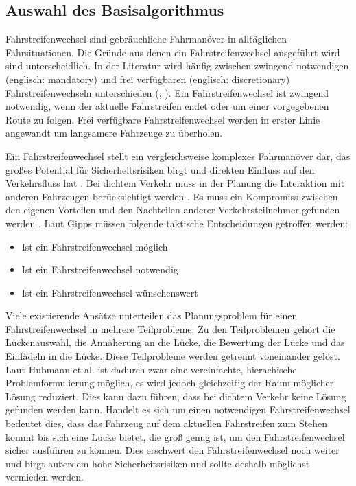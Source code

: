 \subsection{Auswahl des Basisalgorithmus}
\label{sec:AuswahlBA}
Fahrstreifenwechsel sind gebr\"auchliche Fahrman\"over in allt\"aglichen Fahrsituationen.
Die Gr\"unde aus denen ein Fahrstreifenwechsel ausgef\"uhrt wird sind unterscheidlich.
In der Literatur wird h\"aufig zwischen zwingend notwendigen (englisch: mandatory) und frei verf\"ugbaren (englisch: discretionary) Fahrstreifenwechseln unterschieden (\cite{Toledo2003}, \cite{Yang1996}).
Ein Fahrstreifenwechsel ist zwingend notwendig, wenn der aktuelle Fahrstreifen endet oder um einer vorgegebenen Route zu folgen.
Frei verf\"ugbare Fahrstreifenwechsel werden in erster Linie angewandt um langsamere Fahrzeuge zu \"uberholen.

Ein Fahrstreifenwechsel stellt ein vergleichsweise komplexes Fahrman\"over dar, das gro{\ss}es Potential f\"ur Sicherheitsrisiken birgt und direkten Einfluss auf den Verkehrsfluss hat \cite{Julian2015}.
Bei dichtem Verkehr muss in der Planung die Interaktion mit anderen Fahrzeugen ber\"ucksichtigt werden \cite{Hubmann2018}.
Es muss ein Kompromiss zwischen den eigenen Vorteilen und den Nachteilen anderer Verkehrsteilnehmer gefunden werden \cite{Kesting2007}.
Laut Gipps \cite{Gipps1986} m\"ussen folgende taktische Entscheidungen getroffen werden: 

\begin{itemize}
\item Ist ein Fahrstreifenwechsel m\"oglich
\item Ist ein Fahrstreifenwechsel notwendig
\item Ist ein Fahrstreifenwechsel w\"unschenswert
\end{itemize}


Viele existierende Ans\"atze unterteilen das Planungsproblem f\"ur einen Fahrstreifenwechsel in mehrere Teilprobleme. 
Zu den Teilproblemen geh\"ort die L\"uckenauswahl, die Ann\"aherung an die L\"ucke, die Bewertung der L\"ucke und das Einf\"adeln in die L\"ucke.
Diese Teilprobleme werden getrennt voneinander gel\"ost. \cite{Hubmann2018}
Laut Hubmann et al. \cite{Hubmann2018} ist dadurch zwar eine vereinfachte, hierachische Problemformulierung m\"oglich, es wird jedoch gleichzeitig der Raum m\"oglicher L\"osung reduziert.
Dies kann dazu f\"uhren, dass bei dichtem Verkehr keine L\"osung gefunden werden kann.
Handelt es sich um einen notwendigen Fahrstreifenwechsel bedeutet dies, dass das Fahrzeug auf dem aktuellen Fahrstreifen zum Stehen kommt bis sich eine L\"ucke bietet, die gro{\ss} genug ist, um den Fahrstreifenwechsel sicher ausf\"uhren zu k\"onnen.
Dies erschwert den Fahrstreifenwechsel noch weiter und birgt au{\ss}erdem hohe Sicherheitsrisiken und sollte deshalb m\"oglichst vermieden werden.

